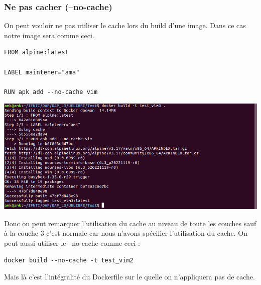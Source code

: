 \documentclass[12pt,a4paper]{article}
\begin{document}
\subsubsection{Ne pas cacher (--no-cache)}
On peut vouloir ne pas utiliser le cache lors du build d'une image. Dans ce cas notre image
sera comme ceci.
\begin{verbatim}
FROM alpine:latest

LABEL maintener="ama"

RUN apk add --no-cache vim
\end{verbatim}
\begin{center}
\includegraphics[scale=0.3]{img/test_vim_no_cache.png}
\end{center}
Donc on peut remarquer l'utilisation du cache au niveau de toute les couches sauf à la 
couche 3 c'est normale car nous n'avons spécifier l'utilisation du cache.
On peut aussi utiliser le --no-cache comme ceci :
\begin{verbatim}
docker build --no-cache -t test_vim2
\end{verbatim}
Mais là c'est l'intégralité du Dockerfile sur le quelle on n'appliquera pas de cache.
\end{document}
